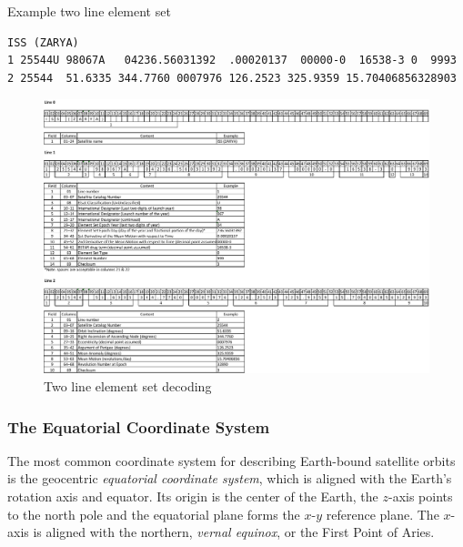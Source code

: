 \documentclass[11pt]{article}
\begin{document}
\begin{table}
  \caption{Example two line element set}\label{figure-two-line-element-set-example}
  \small
\begin{verbatim}
ISS (ZARYA)
1 25544U 98067A   04236.56031392  .00020137  00000-0  16538-3 0  9993
2 25544  51.6335 344.7760 0007976 126.2523 325.9359 15.70406856328903
\end{verbatim}
\end{table}

\begin{landscape}
  \begin{figure}
    \includegraphics[width=7.0in]{figure-two-line-element-set-decoding.pdf}
    \caption{Two line element set decoding}\label{figure-two-line-element-set-decoding}
  \end{figure}
\end{landscape}

\subsubsection{The Equatorial Coordinate System}

The most common coordinate system for describing Earth-bound satellite
orbits is the geocentric {\em equatorial coordinate system}, which is
aligned with the Earth's rotation axis and equator. Its origin is the
center of the Earth, the $z$-axis points to the north pole and the
equatorial plane forms the $x$-$y$ reference plane. The $x$-axis is
aligned with the northern, {\em vernal equinox}, or the First Point of
Aries.
\end{document}
